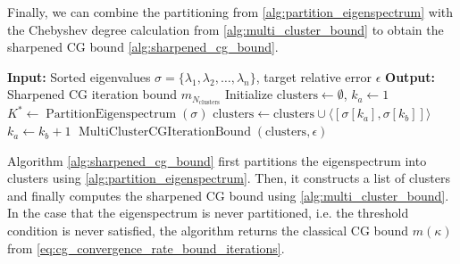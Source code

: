 Finally, we can combine the partitioning from \cref{alg:partition_eigenspectrum} with the Chebyshev degree calculation from \cref{alg:multi_cluster_bound} to obtain the sharpened CG bound \cref{alg:sharpened_cg_bound}.
\begin{algorithm}[H]
    \caption{$\operatorname{SharpenedCGIterationBound}(\sigma, \epsilon)$}
    \begin{algorithmic}[1]
        \State \textbf{Input:} Sorted eigenvalues $\sigma = \{\lambda_1, \lambda_2, \ldots, \lambda_n\}$, target relative error $\epsilon$
        \State \textbf{Output:} Sharpened CG iteration bound $m_{N_{\text{clusters}}}$
        \State Initialize $\text{clusters} \gets \emptyset$, $k_a \gets 1$
        \State $K^* \gets \operatorname{PartitionEigenspectrum}(\sigma)$
            \State $\text{clusters} \gets \text{clusters} \cup \langle[\sigma[k_a], \sigma[k_b]]\rangle$
            \State $k_a \gets k_b + 1$
        \EndFor
        \State \Return $\operatorname{MultiClusterCGIterationBound}(\text{clusters}, \epsilon)$
    \end{algorithmic}
    \label{alg:sharpened_cg_bound}
\end{algorithm}
Algorithm \ref{alg:sharpened_cg_bound} first partitions the eigenspectrum into clusters using \cref{alg:partition_eigenspectrum}. Then, it constructs a list of clusters and finally computes the sharpened CG bound using \cref{alg:multi_cluster_bound}. In the case that the eigenspectrum is never partitioned, i.e. the threshold condition is never satisfied, the algorithm returns the classical CG bound $m(\kappa)$ from \cref{eq:cg_convergence_rate_bound_iterations}.